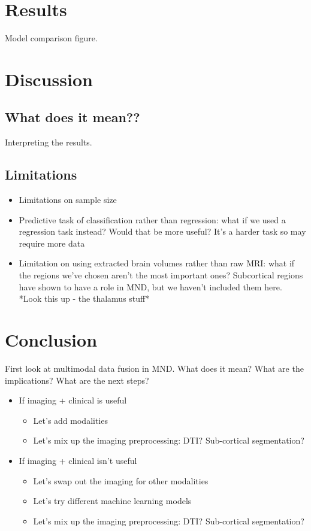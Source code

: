 \section{Results}
Model comparison figure.

\section{Discussion}
\subsection{What does it mean??}
Interpreting the results.

\subsection{Limitations}
\begin{itemize}
    \item Limitations on sample size
    \item Predictive task of classification rather than regression: what if we used a regression task instead? Would that be more useful? It's a harder task so may require more data
    \item Limitation on using extracted brain volumes rather than raw MRI: what if the regions we've chosen aren't the most important ones? Subcortical regions have shown to have a role in MND, but we haven't included them here. *Look this up - the thalamus stuff*
\end{itemize}

\section{Conclusion}
First look at multimodal data fusion in MND. What does it mean? What are the implications? What are the next steps?
\begin{itemize}
    \item If imaging + clinical is useful
    \begin{itemize}
        \item Let's add modalities
        \item Let's mix up the imaging preprocessing: DTI? Sub-cortical segmentation?
    \end{itemize}
    \item If imaging + clinical isn't useful
    \begin{itemize}
        \item Let's swap out the imaging for other modalities
        \item Let's try different machine learning models
        \item Let's mix up the imaging preprocessing: DTI? Sub-cortical segmentation?
    \end{itemize}
\end{itemize}

